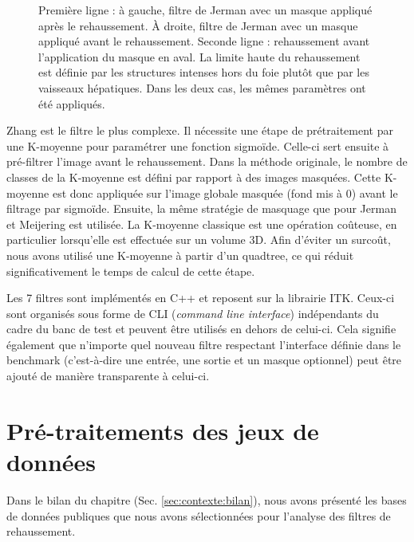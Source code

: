 \begin{figure}[!ht]
  \centering
  \caption{Première ligne : à gauche, filtre de Jerman avec un masque appliqué après le rehaussement. À droite, filtre de Jerman avec un masque appliqué avant le rehaussement. Seconde ligne : rehaussement avant l'application du masque en aval. La limite haute du rehaussement est définie par les structures intenses hors du foie plutôt que par les vaisseaux hépatiques. Dans les deux cas, les mêmes paramètres ont été appliqués.}
  \label{fig:smart_mask_effect}
\end{figure}
Zhang est le filtre le plus complexe. Il nécessite une étape de prétraitement par une K-moyenne pour paramétrer une fonction sigmoïde. Celle-ci sert ensuite à pré-filtrer l'image avant le rehaussement. Dans la méthode originale, le nombre de classes de la K-moyenne est défini par rapport à des images masquées. Cette K-moyenne est donc appliquée sur l'image globale masquée (fond mis à 0) avant le filtrage par sigmoïde. Ensuite, la même stratégie de masquage que pour Jerman et Meijering est utilisée. La K-moyenne classique est une opération coûteuse, en particulier lorsqu'elle est effectuée sur un volume 3D. Afin d'éviter un surcoût, nous avons utilisé une K-moyenne à partir d'un quadtree, ce qui réduit significativement le temps de calcul de cette étape.

Les 7 filtres sont implémentés en C++ et reposent sur la librairie ITK. Ceux-ci sont organisés sous forme de CLI (\textit{command line interface}) indépendants du cadre du banc de test et peuvent être utilisés en dehors de celui-ci. Cela signifie également que n'importe quel nouveau filtre respectant l'interface définie dans le benchmark (c'est-à-dire une entrée, une sortie et un masque optionnel) peut être ajouté de manière transparente à celui-ci.
\section{Pré-traitements des jeux de données}
\label{sec:Benchmark:traitement_des_données}
Dans le bilan du chapitre \chapContextN{} (Sec. \ref{sec:contexte:bilan}), nous avons présenté les bases de données publiques que nous avons sélectionnées pour l'analyse des filtres de rehaussement.

